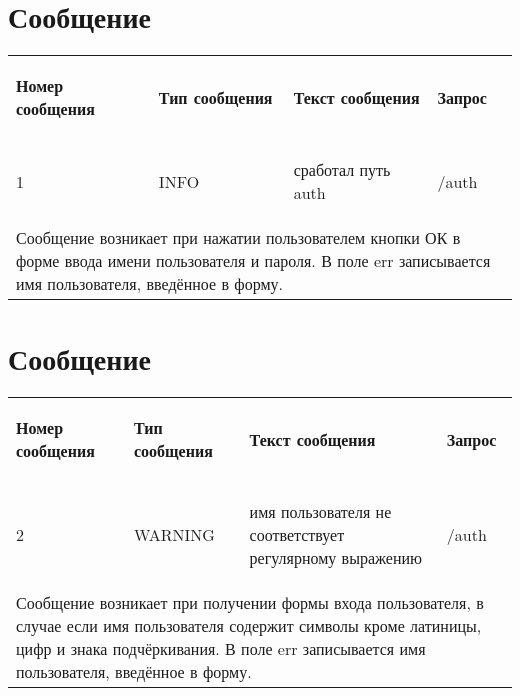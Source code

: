 \def\errnumber{1}%
\def\errtype{INFO}%
\def\errmessage{сработал путь auth}%
\def\errrequest{/auth}%
\def\errtext{Сообщение возникает при нажатии пользователем кнопки ОК в форме ввода имени пользователя и пароля. В поле err записывается имя пользователя, введённое в форму.}
\def\geterr{\section{Сообщение \textnumero\errnumber}
	\begin{tabular}{|p{3cm}||p{4cm}||p{4cm}||p{4cm}|}
		
		\hline 
		\begin{center}\textbf{Номер сообщения}\end{center}&\begin{center}\textbf{Тип сообщения}\end{center} &\begin{center}\textbf{Текст сообщения}\end{center} & \begin{center}\textbf{Запрос}\end{center} \\
		
		\begin{center}\errnumber\end{center}&\begin{center}\errtype\end{center}
		&\begin{center}\errmessage\end{center} & \begin{center}\errrequest\end{center} \\
		
		\hline
		\multicolumn{4}{|p{16.5cm}|}{\errtext} \\
		\hline
		
\end{tabular} }

\geterr


\def\errnumber{2}%
\def\errtype{WARNING}%
\def\errmessage{имя пользователя не соответствует регулярному выражению}%
\def\errrequest{/auth}%
\def\errtext{Сообщение возникает при получении формы входа пользователя, в случае если имя пользователя содержит символы кроме латиницы, цифр и знака подчёркивания. В поле err записывается имя пользователя, введённое в форму.}
\geterr